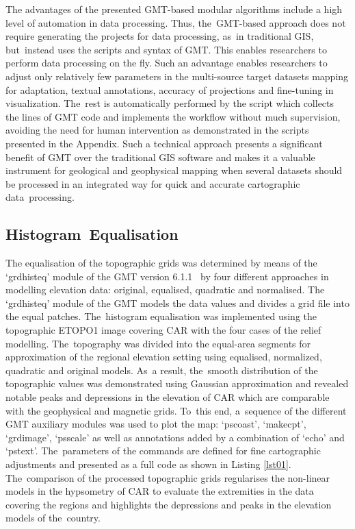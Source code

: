 \documentclass[minerals,article,accept,pdftex,moreauthors]{Definitions/mdpi}
\begin{document}
The advantages of the presented GMT-based modular algorithms include a high level of automation in data processing. Thus, the~GMT-based approach does not require generating the projects for data processing, as~in traditional GIS, but~instead uses the scripts and syntax of GMT. This enables researchers to perform data processing on the fly. Such an advantage enables researchers to adjust only relatively few parameters in the multi-source target datasets mapping for adaptation, textual annotations, accuracy of projections and fine-tuning in visualization. The~rest is automatically performed by the script which collects the lines of GMT code and implements the workflow without much supervision, avoiding the need for human intervention as demonstrated in the scripts presented in the Appendix. %
Such a technical approach presents a significant benefit of GMT over the {traditional GIS} software and makes it a valuable instrument for geological and geophysical mapping when several datasets should be processed in an integrated way for quick and accurate cartographic data~processing.

\subsection{Histogram~Equalisation}

The equalisation of the topographic grids was determined by means of the `grdhisteq' module of the GMT version 6.1.1~\cite{WesselSmith1991,Wessel} by four different approaches in modelling elevation data: original, equalised, quadratic and normalised. The `grdhisteq’ module of the GMT models the data values and divides a grid file into the equal patches. The~histogram equalisation was implemented using the topographic ETOPO1 image covering CAR with the four cases of the relief modelling. The~topography was divided into the equal-area segments for approximation of the regional elevation setting using equalised, normalized, quadratic and original models. As~a result, the~smooth distribution of the topographic values was demonstrated using Gaussian approximation and revealed notable peaks and depressions in the elevation of CAR which are comparable with the geophysical and magnetic grids. To~this end, a~sequence of the different GMT auxiliary modules was used to plot the map: `pscoast', `makecpt', `grdimage', `psscale' as well as annotations added by a combination of `echo' and `pstext'. The~parameters of the commands are defined for fine cartographic adjustments and presented as a full code as shown in Listing \ref{lst01}. The~comparison of the processed topographic grids regularises the non-linear models in the hypsometry of CAR to evaluate the extremities in the data covering the regions and highlights the depressions and peaks in the elevation models of the~country.
\end{document}
